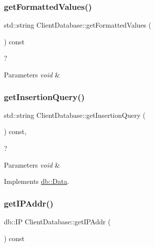 \subsubsection{\texorpdfstring{get\+Formatted\+Values()}{getFormattedValues()}}
{\footnotesize\ttfamily std\+::string Client\+Database\+::get\+Formatted\+Values (\begin{DoxyParamCaption}{ }\end{DoxyParamCaption}) const\hspace{0.3cm}{\ttfamily [noexcept]}}



? 


\begin{DoxyParams}{Parameters}
{\em void} & \\
\hline
\end{DoxyParams}
\mbox{\label{classdb_1_1_client_database_ad342a032236484edb6df718d7ee746b1}} 
\subsubsection{\texorpdfstring{get\+Insertion\+Query()}{getInsertionQuery()}}
{\footnotesize\ttfamily std\+::string Client\+Database\+::get\+Insertion\+Query (\begin{DoxyParamCaption}{ }\end{DoxyParamCaption}) const\hspace{0.3cm}{\ttfamily [virtual]}, {\ttfamily [noexcept]}}



? 


\begin{DoxyParams}{Parameters}
{\em void} & \\
\hline
\end{DoxyParams}


Implements \hyperlink{classdb_1_1_data}{db\+::\+Data}.

\mbox{\label{classdb_1_1_client_database_a7300e226455d344798c75c3232b1218a}} 
\subsubsection{\texorpdfstring{get\+I\+P\+Addr()}{getIPAddr()}}
{\footnotesize\ttfamily db\+::\+IP Client\+Database\+::get\+I\+P\+Addr (\begin{DoxyParamCaption}{ }\end{DoxyParamCaption}) const}



